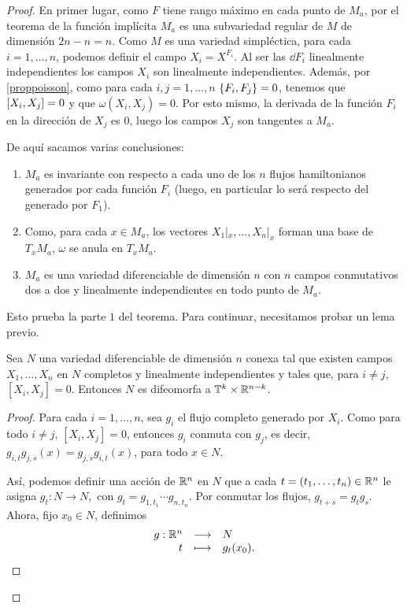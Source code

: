  \begin{proof}
  En primer lugar, como $F$ tiene rango máximo en cada punto de $M_a$, por el teorema de la función implícita $M_a$ es una subvariedad regular de $M$ de dimensión $2n-n=n$. 
  Como $M$ es una variedad simpléctica, para cada $i=1,\dots,n$, podemos definir el campo $X_i=X^{F_i}$. Al ser las $\dd F_i$ linealmente independientes los campos $X_i$ son linealmente independientes. Además, por \ref{proppoisson}, como para cada $i,j= 1,\dots,n$ $\left\lbrace F_i,F_j\right\rbrace=0$, tenemos que $\left[X_i,X_j\right]=0$ y que $\omega(X_i,X_j)=0$. Por esto mismo, la derivada de la función $F_i$ en la dirección de $X_j$ es 0, luego los campos $X_j$ son tangentes a $M_a$.

  De aquí sacamos varias conclusiones:
  \begin{enumerate}
    \item $M_a$ es invariante con respecto a cada uno de los $n$ flujos hamiltonianos generados por cada función $F_i$ (luego, en particular lo será respecto del generado por $F_1$).
    \item Como, para cada $x \in M_a$, los vectores $X_1|_x,\dots, X_n|_x$ forman una base de $T_x M_a$, $\omega$ se anula en $T_x M_a$. 
    \item $M_a$ es una variedad diferenciable de dimensión $n$ con $n$ campos conmutativos dos a dos y linealmente independientes en todo punto de $M_a$. 
  \end{enumerate}

  Esto prueba la parte $1$ del teorema. Para continuar, necesitamos probar un lema previo.

  \begin{lema}\label{lemtoro}
    Sea $N$ una variedad diferenciable de dimensión $n$ conexa tal que existen campos $X_1,\dots,X_n$ en $N$ completos y linealmente independientes y tales que, para $i\neq j$, $[X_i,X_j]=0$. Entonces $N$ es difeomorfa a $\mathbb{T}^k\times \mathbb{R}^{n-k}$. 
\end{lema}
\begin{proof}
  Para cada $i=1,\dots,n$, sea $g_i$ el flujo completo generado por $X_i$. Como para todo $i\neq j$, $[X_i,X_j]=0 $, entonces $g_i$ conmuta con $g_j$, es decir, $g_{i,t}g_{j,s} (x)=g_{j,s}g_{i,t} (x)$, para todo $x \in N$. 

  Así, podemos definir una acción de $\mathbb{R}^n$ en $N$ que a cada $t=(t_1,\dots,t_n)\in \mathbb{R}^n$ le asigna $g_t:N\rightarrow N,$ con $g_t=g_{1,t_1}\cdots g_{n,t_n}$.
Por conmutar los flujos, $g_{t+s}=g_t g_s$. Ahora, fijo $x_0 \in N$, definimos 
\[
  \begin{array}{rcl}
g:\mathbb{R}^n & \longrightarrow & N \\
t & \longmapsto & g_t (x_0).
\end{array}
\]


\end{proof}
\end{proof}
